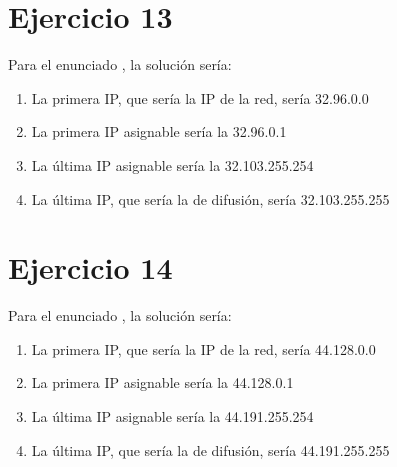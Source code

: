 \documentclass[letterpaper,10pt,spanish]{sphinxmanual}
\begin{document}
\section{Ejercicio 13}
\label{\detokenize{t2_integracion_elementos/ejercicios_subredes_ipv4/rangos_direcciones:id13}}
\sphinxAtStartPar
Para el enunciado , la solución sería:
\begin{enumerate}
%
\item {} 
\sphinxAtStartPar
La primera IP, que sería la IP de la red, sería 32.96.0.0

\item {} 
\sphinxAtStartPar
La primera IP asignable sería la 32.96.0.1

\item {} 
\sphinxAtStartPar
La última IP asignable sería la 32.103.255.254

\item {} 
\sphinxAtStartPar
La última IP, que sería la de difusión, sería 32.103.255.255

\end{enumerate}


\section{Ejercicio 14}
\label{\detokenize{t2_integracion_elementos/ejercicios_subredes_ipv4/rangos_direcciones:id14}}
\sphinxAtStartPar
Para el enunciado , la solución sería:
\begin{enumerate}
%
\item {} 
\sphinxAtStartPar
La primera IP, que sería la IP de la red, sería 44.128.0.0

\item {} 
\sphinxAtStartPar
La primera IP asignable sería la 44.128.0.1

\item {} 
\sphinxAtStartPar
La última IP asignable sería la 44.191.255.254

\item {} 
\sphinxAtStartPar
La última IP, que sería la de difusión, sería 44.191.255.255

\end{enumerate}
\end{document}
